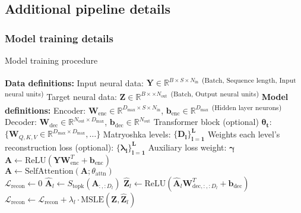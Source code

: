 \subsection{Additional pipeline details}
\label{subsection:additional_pipeline_details}

\subsubsection{Model training details}
\label{subsubsection:model_training_details}

\begin{algorithm}[bh]
\caption{Model training procedure}
\label{algorithm:sdnn_model_training}
\begin{algorithmic}[1]
\State \textbf{Data definitions:}
\State \quad Input neural data: $\mathbf{Y} \in \mathbb{R}^{B \times S \times N_{\text{in}}}$ \textsuperscript{(Batch, Sequence length, Input neural units)}
\State \quad Target neural data: $\mathbf{Z} \in \mathbb{R}^{B \times \times N_{\text{out}}}$ \textsuperscript{(Batch, Output neural units)}
\State \textbf{Model definitions:}
\State \quad Encoder: $\mathbf{W}_{\text{enc}} \in \mathbb{R}^{D_{\text{max}} \times S \times N_{\text{in}}}$, $\mathbf{b}_{\text{enc}} \in \mathbb{R}^{D_{\text{max}}}$ \textsuperscript{(Hidden layer neurons)}
\State \quad Decoder: $\mathbf{W}_{\text{dec}} \in \mathbb{R}^{N_{\text{out}} \times D_{\text{max}}}$, $\mathbf{b}_{\text{dec}} \in \mathbb{R}^{N_{\text{out}}}$
\State \quad Transformer block (optional) $\mathbf{\theta_{t}}$: $\{\mathbf{W}_{Q,K,V} \in \mathbb{R}^{D_{\max} \times D_{\max}}, \dots\}$
\State \quad Matryoshka levels: $\mathbf{\{D_l\}_{l=1}^L}$
\State \quad Weights each level's reconstruction loss (optional): $\mathbf{\{\lambda_l\}_{l=1}^L}$
\State \quad Auxiliary loss weight: $\mathbf{\gamma}$
\\
    \Statex {}
    \State $\mathbf{A} \gets \text{ReLU}(\mathbf{Y}\mathbf{W}_{\text{enc}}^T + \mathbf{b}_{\text{enc}})$ 
    \\
        \State $\mathbf{A} \gets \text{SelfAttention}(\mathbf{A}; \theta_{\text{attn}})$ 
    \EndIf
    \\
    \State $\mathcal{L}_{\text{recon}} \gets 0$
     
        \State $\hat{\mathbf{A}}_l \gets S_{\text{topk}}(\mathbf{A}_{:, :D_l})$ 
        \State $\hat{\mathbf{Z}}_l \gets \text{ReLU}(\hat{\mathbf{A}}_l \mathbf{W}_{\text{dec}, :, :D_l}^T + \mathbf{b}_{\text{dec}})$ 
        \State $\mathcal{L}_{\text{recon}} \gets \mathcal{L}_{\text{recon}} + \lambda_l \cdot \text{MSLE}(\mathbf{Z}, \hat{\mathbf{Z}}_l)$ 
    \EndFor
    

\end{algorithmic}
\end{algorithm}
